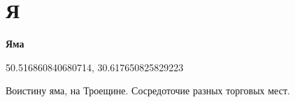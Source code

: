 \chapter*{Я}

\textbf{Яма}

50.516860840680714, 30.617650825829223

Воистину яма, на Троещине. Сосредоточие разных торговых мест.
